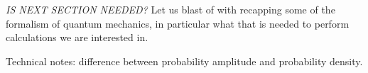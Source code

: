 \textit{IS NEXT SECTION NEEDED?}
Let us blast of with recapping some of the formalism of quantum mechanics, in particular what that is needed to perform calculations we are interested in.

Technical notes:
difference between probability amplitude and probability density.